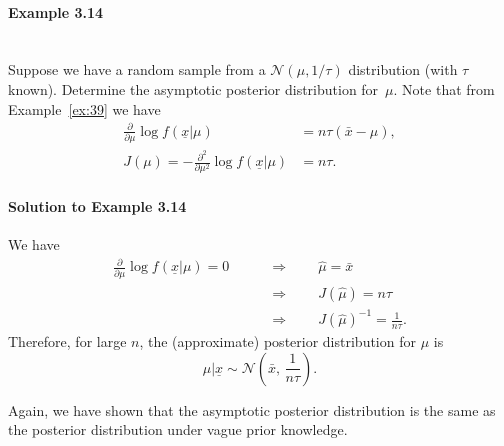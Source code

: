 \paragraph{Example 3.14}{~\\
Suppose we have a random sample from a $\mathcal{N}(\mu,1/\tau)$ distribution
(with $\tau$ known). Determine the asymptotic posterior distribution
for~$\mu$. Note that from Example~\ref{ex:39} we have
\begin{align*}
\frac{\partial}{\partial\mu} \log
f(\underline{x}|\mu)&=n\tau(\bar x-\mu), \\
J(\mu)=-\frac{\partial^2}{\partial\mu^2} \log
f(\underline{x}|\mu)&=n\tau.
\end{align*}



\paragraph{Solution to Example 3.14}{
    
    We have
    \begin{align*}
    \frac{\partial}{\partial\mu} \log f(\underline{x}|\mu)=0
    \quad\quad&\Longrightarrow\quad\quad
    \hat\mu=\bar x \\
    &\Longrightarrow\quad\quad
    J(\hat\mu)=n\tau \\
    &\Longrightarrow\quad\quad
    J(\hat\mu)^{-1}=\frac{1}{n\tau}.
    \end{align*}
    Therefore, for large $n$, the (approximate) posterior distribution for $\mu$ is
    $$
    \mu|\underline{x}\sim \mathcal{N}\left(\bar x,\,\frac{1}{n\tau}\right).
    $$
    
    
}

Again, we have shown that the asymptotic posterior distribution is the
same as the posterior distribution under vague prior knowledge.}

